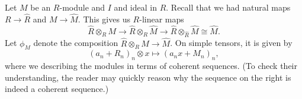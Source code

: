 Let $M$ be an $R$-module and $I$ and ideal in $R$. Recall that we had natural maps $R \to \widehat{R}$ and $M \to \widehat{M}$. This gives us $R$-linear maps
\begin{equation*} 
	\widehat{R} \otimes_{R} M \to \widehat{R} \otimes_{R} \widehat{M} \to \widehat{R} \otimes_{\widehat{R}} \widehat{M} \cong \widehat{M}.
\end{equation*}
Let $\phi_{M}$ denote the composition $\widehat{R} \otimes_{R} M \to \widehat{M}$. On simple tensors, it is given by
\begin{equation*} 
	(a_{n} + R_{n})_{n} \otimes x \mapsto (a_{n} x + M_{n})_{n},
\end{equation*}
where we describing the modules in terms of coherent sequences. (To check their understanding, the reader may quickly reason why the sequence on the right is indeed a coherent sequence.)

